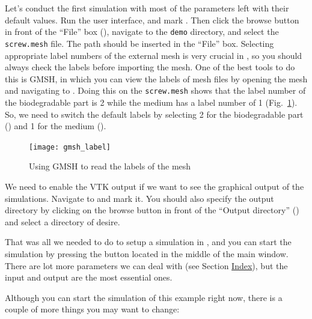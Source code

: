 Let's conduct the first simulation with most of the parameters left with their default values. Run the user interface, and mark . Then click the browse button in front of the ``File'' box (), navigate to the \verb|demo| directory, and select the \verb|screw.mesh| file. The path should be inserted in the ``File'' box. Selecting appropriate label numbers of the external mesh is very crucial in \biodeg{}, so you should always check the labels before importing the mesh. One of the best tools to do this is GMSH, in which you can view the labels of mesh files by opening the mesh and navigating to . Doing this on the \verb|screw.mesh| shows that the label number of the biodegradable part is 2 while the medium has a label number of 1 (Fig.~\ref{fig:gmsh_label}). So, we need to switch the default labels by selecting 2 for the biodegradable part () and 1 for the medium ().

\begin{figure}[h]
\center \texttt{[image: gmsh\_label]}
\caption{Using GMSH to read the labels of the mesh} \label{fig:gmsh_label}
\end{figure}

We need to enable the VTK output if we want to see the graphical output of the simulations. Navigate to  and mark it. You should also specify the output directory by clicking on the browse button in front of the ``Output directory'' () and select a directory of desire.

That was all we needed to do to setup a simulation in \biodeg{}, and you can start the simulation by pressing the  button located in the middle of the main window. There are lot more parameters we can deal with (see Section \hyperref[sec:index]{Index}), but the input and output are the most essential ones.

Although you can start the simulation of this example right now, there is a couple of more things you may want to change:

